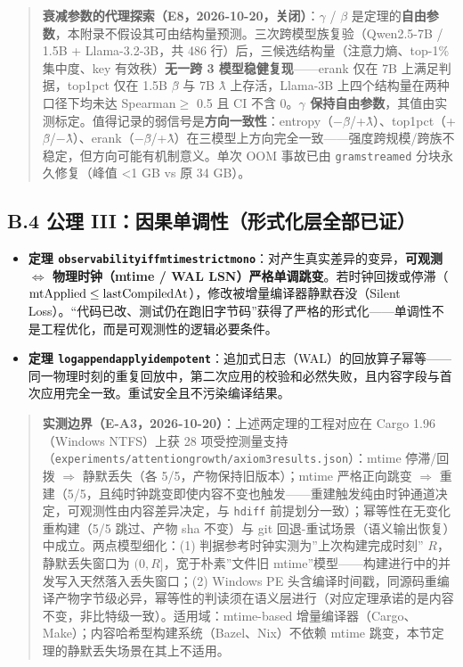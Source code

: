 \documentclass[
]{ctexart}
\providecommand{\tightlist}{%
  \setlength{\itemsep}{0pt}\setlength{\parskip}{0pt}}
\renewcommand{\_}{\discretionary{}{}{\textunderscore}}
\renewcommand{\text}[1]{\textnormal{#1}}
\begin{document}
\begin{quote}
\textbf{衰减参数的代理探索（E8，2026-10-20，关闭）}：\(\gamma\) /
\(\beta\)
是定理的\textbf{自由参数}，本附录不假设其可由结构量预测。三次跨模型族复验（Qwen2.5-7B
/ 1.5B + Llama-3.2-3B，共 486 行）后，三候选结构量（注意力熵、top-1\%
集中度、key 有效秩）\textbf{无一跨 3 模型稳健复现}------erank 仅在 7B
上满足判据，top1pct 仅在 1.5B \(\beta\)̂ 与 7B \(\lambda\)̂
上存活，Llama-3B 上四个结构量在两种口径下均未达
\textbar Spearman\textbar{}\(\ge\) 0.5 且 CI 不含 0。\textbf{\(\gamma\)
保持自由参数}，其值由实测标定。值得记录的弱信号是\textbf{方向一致性}：entropy（−\(\beta\)̂/+\(\lambda\)̂）、top1pct（+\(\beta\)̂/−\(\lambda\)̂）、erank（−\(\beta\)̂/+\(\lambda\)̂）在三模型上方向完全一致------强度跨规模/跨族不稳定，但方向可能有机制意义。单次
OOM 事故已由 \texttt{\_gram\_streamed} 分块永久修复（峰值 \textless1 GB
vs 原 34 GB）。
\end{quote}

\subsection{B.4 公理
III：因果单调性（形式化层全部已证）}\label{b.4-ux516cux7406-iiiux56e0ux679cux5355ux8c03ux6027ux5f62ux5f0fux5316ux5c42ux5168ux90e8ux5df2ux8bc1}

\begin{itemize}
\tightlist
\item
  \textbf{定理
  \texttt{observability\_iff\_mtime\_strict\_mono}}：对产生真实差异的变异，\textbf{可观测
  \(\Leftrightarrow\) 物理时钟（mtime / WAL
  LSN）严格单调跳变}。若时钟回拨或停滞（\(\text{mtApplied} \le \text{lastCompiledAt}\)），修改被增量编译器静默吞没（Silent
  Loss）。``代码已改、测试仍在跑旧字节码''获得了严格的形式化------单调性不是工程优化，而是可观测性的逻辑必要条件。
\item
  \textbf{定理
  \texttt{log\_append\_apply\_idempotent}}：追加式日志（WAL）的回放算子幂等------同一物理时刻的重复回放中，第二次应用的校验和必然失败，且内容字段与首次应用完全一致。重试安全且不污染编译结果。
\end{itemize}

\begin{quote}
\textbf{实测边界（E-A3，2026-10-20）}：上述两定理的工程对应在 Cargo
1.96（Windows NTFS）上获 28
项受控测量支持（\texttt{experiments/attention\_growth/axiom3\_results.json}）：mtime
停滞/回拨 \(\Rightarrow\) 静默丢失（各 5/5，产物保持旧版本）；mtime
严格正向跳变 \(\Rightarrow\)
重建（5/5，且纯时钟跳变即使内容不变也触发------重建触发纯由时钟通道决定，可观测性由内容差异决定，与
\texttt{hdiff} 前提划分一致）；幂等性在无变化重构建（5/5 跳过、产物 sha
不变）与 git 回退-重试场景（语义输出恢复）中成立。两点模型细化：(1)
判据参考时钟实测为''上次构建完成时刻'' \(R\)，静默丢失窗口为
\((0, R]\)，宽于朴素''文件旧
mtime''模型------构建进行中的并发写入天然落入丢失窗口；(2) Windows PE
头含编译时间戳，同源码重编译产物字节级必异，幂等性的判读须在语义层进行（对应定理承诺的是内容不变，非比特级一致）。适用域：mtime-based
增量编译器（Cargo、Make）；内容哈希型构建系统（Bazel、Nix）不依赖 mtime
跳变，本节定理的静默丢失场景在其上不适用。
\end{quote}
\end{document}
